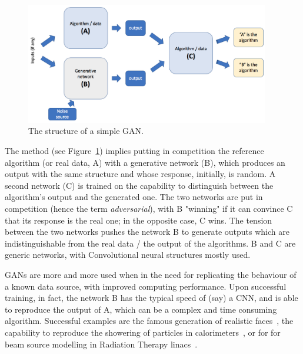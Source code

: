 \begin{figure}[h]
     \centering
     \includegraphics[width=0.95\textwidth]{images/gan.png}
     \caption{The structure of a simple GAN.}
     \label{fig:gan}
 \end{figure}

The method (see Figure~\ref{fig:gan}) implies putting in competition the reference algorithm (or real data, A) with a generative network (B), which produces an output with the same structure and whose response, initially, is random. A second network (C) is trained on the capability to distinguish between the algorithm's output and the generated one. The two networks are put in competition (hence the term \emph{adversarial}), with B "winning" if it can convince C that its response is the real one; in the opposite case, C wins.
The tension between the two networks pushes the network B to generate outputs which are indistinguishable from the real data / the output of the  algorithms. B and C are generic networks, with Convolutional neural structures mostly used.

GANs are more and more used when in the need for replicating the behaviour of a known data source, with improved computing performance. Upon successful training, in fact, the network B has the typical speed of (say) a CNN, and is able to reproduce the output of A, which can be a complex and time consuming algorithm. Successful examples are the famous generation of realistic faces~\cite{faces}, the capability to reproduce the showering of particles in calorimeters~\cite{calogan}, or for 
for beam source modelling in Radiation Therapy linacs~\cite{Sarrut2019}.


